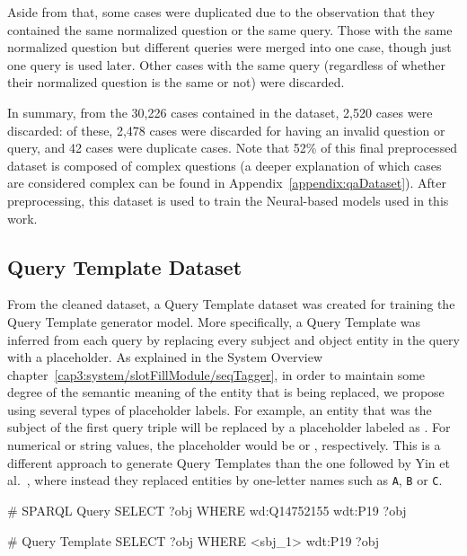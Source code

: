 Aside from that, some cases were duplicated due to the observation that they contained the same 
normalized question or the same \SPARQL{} query. Those with the same normalized question but 
different \SPARQL{} queries were merged into one case, though just one \SPARQL{} query is used later. 
Other cases with the same \SPARQL{} query (regardless of whether their normalized question is the 
same or not) were discarded.

In summary, from the 30,226 cases contained in the \LCQuADtwo{} dataset, 2,520 cases were 
discarded: of these, 2,478 cases were discarded for having an invalid question or query, and 42 
cases were duplicate cases. Note that 52\% of this final preprocessed dataset is composed of 
complex questions (a deeper explanation of which cases are considered complex can be found in 
Appendix~\ref{appendix:qaDataset}). After preprocessing, this dataset is used to train the 
Neural-based models used in this work.

\subsection{Query Template Dataset}
\label{cap4:experimentalDesign/QaDataset/queryTemplate}
From the cleaned \LCQuADtwo{} dataset, a Query Template dataset was created for training the 
Query Template generator model. More specifically, a Query Template was inferred from each 
\SPARQL{} query by replacing every subject and object entity in the query with a placeholder. 
As explained in the System Overview chapter~\ref{cap3:system/slotFillModule/seqTagger}, in order 
to maintain some degree of the semantic meaning of the entity that is being replaced, we 
propose using several types of placeholder labels. For example, an entity that was the subject 
of the first query triple will be replaced by a placeholder labeled as . For 
numerical or string values, the placeholder would be  or , 
respectively. This is a different approach to generate Query Templates than the one followed by 
Yin et al.~\cite{nmt:nl-to-sparql-Yin19}, where instead they replaced entities by one-letter 
names such as \texttt{A}, \texttt{B} or \texttt{C}.

\begin{sparqlcode}[%
    caption={\SPARQL{} query and its Query Template version.}, 
    label={lst:queryTemplateExampleLcquad2}]
# SPARQL Query
SELECT ?obj WHERE { wd:Q14752155 wdt:P19 ?obj }

# Query Template
SELECT ?obj WHERE { <sbj_1> wdt:P19 ?obj }
\end{sparqlcode}

